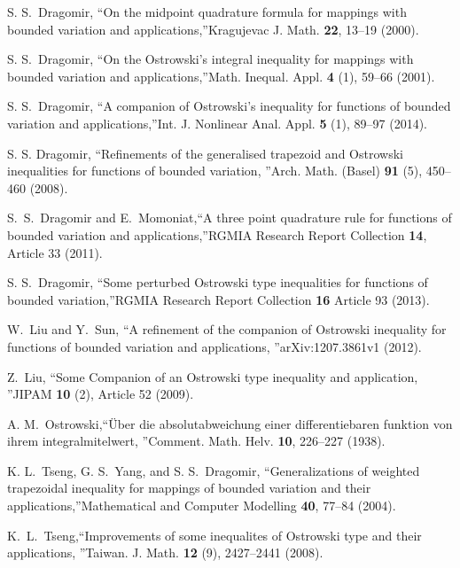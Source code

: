 \documentclass[
11pt,%
tightenlines,%
twoside,%
onecolumn,%
nofloats,%
nobibnotes,%
nofootinbib,%
superscriptaddress,%
noshowpacs,%
centertags]%
{revtex4}
\begin{document}
\begin{thebibliography}{20}
 S. S.~Dragomir, \textquotedblleft On the midpoint quadrature
formula for mappings with bounded variation and
applications,\textquotedblright Kragujevac J. Math. \textbf{22},
13--19 (2000).

 S. S.~Dragomir, \textquotedblleft On the Ostrowski's integral
inequality for mappings with bounded variation and
applications,\textquotedblright Math. Inequal. Appl. \textbf{4} (1),
59--66 (2001).

 S. S.~Dragomir, \textquotedblleft A companion of Ostrowski's
inequality for functions of bounded variation and applications,\textquotedblright Int. J.
Nonlinear Anal. Appl. \textbf{5} (1), 89--97 (2014).

 S. S. Dragomir, \textquotedblleft Refinements of the generalised
trapezoid and Ostrowski inequalities for functions of bounded
variation, \textquotedblright Arch. Math. (Basel) \textbf{91} (5),
450--460 (2008).

 S.~S.~Dragomir and E.~Momoniat,\textquotedblleft A three point
quadrature rule for functions of bounded variation and applications,\textquotedblright RGMIA
Research Report Collection \textbf{14}, Article 33 (2011).

 S. S.~Dragomir, \textquotedblleft Some perturbed Ostrowski type
inequalities for functions of bounded variation,\textquotedblright RGMIA
Research Report Collection \textbf{16} Article 93 (2013).

 W.~Liu and Y.~Sun, \textquotedblleft A refinement of the companion of
Ostrowski inequality for functions of bounded variation and
applications,  \textquotedblright arXiv:1207.3861v1 (2012).

 Z.~Liu, \textquotedblleft Some Companion of an Ostrowski type
inequality and application, \textquotedblright JIPAM  \textbf{10}
(2), Article 52 (2009).

 A. M.~Ostrowski,\textquotedblleft \"{U}ber die absolutabweichung
einer differentiebaren funktion von ihrem integralmitelwert,
\textquotedblright Comment. Math. Helv. \textbf{10}, 226--227
(1938).

 K. L.~Tseng, G. S.~Yang, and S. S.~Dragomir, \textquotedblleft Generalizations of weighted trapezoidal inequality for mappings of bounded
variation and their applications,\textquotedblright Mathematical and
Computer Modelling  \textbf{40}, 77--84 (2004).

 K.~L.~Tseng,\textquotedblleft Improvements of some inequalites of
Ostrowski type and their applications, \textquotedblright Taiwan. J.
Math. \textbf{12} (9), 2427--2441 (2008).


\end{thebibliography}
\end{document}
